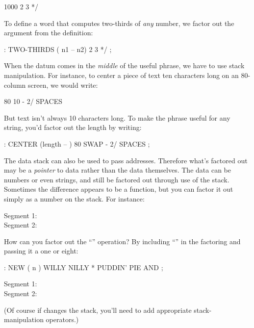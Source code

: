 \begin{Code}
1000 2 3 */
\end{Code}
To define a word that computes two-thirds of \emph{any} number,
we factor out the argument from the definition:

\begin{Code}
: TWO-THIRDS  ( n1 -- n2)  2 3 */ ;
\end{Code}
When the datum comes in the \emph{middle} of the useful phrase, we
have to use stack manipulation. For instance, to center a piece of
text ten characters long on an 80-column screen, we would write:

\begin{Code}
80  10 -   2/ SPACES
\end{Code}
But text isn't always 10 characters long. To make the phrase useful
for any string, you'd factor out the length by writing:

\begin{Code}
: CENTER (length -- ) 80  SWAP -  2/ SPACES ;
\end{Code}
The data stack can also be used to pass addresses. Therefore what's
factored out may be a \emph{pointer} to data rather than the data
themselves. The data can be numbers or even strings, and still be
factored out through use of the stack.  Sometimes the difference
appears to be a function, but you can factor it out simply as a number
on the stack. For instance:

\begin{description}
\item[Segment 1:] 
\item[Segment 2:] 
\end{description}

\noindent How can you factor out the ``'' operation?
By including ``\forth{*}'' in the factoring and passing it a one or eight:

\begin{Code}
: NEW  ( n )  WILLY NILLY  *  PUDDIN' PIE AND ;
\end{Code}

\begin{description}
\item[Segment 1:] 
\item[Segment 2:] 
\end{description}

\noindent 
(Of course if  changes the stack, you'll need to
add appropriate stack-manipulation operators.)

